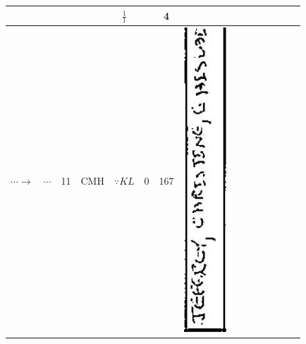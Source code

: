 \documentclass[10pt]{article}
\begin{document}
\begin{center}
\begin{tabular}{|c|c|c|c|c|c|c|c|c|c|c|c|c|c|c|}
 &  &  &  & \(\frac{1}{1}\) &  & 4 &  \\
\hline
\(\cdots \rightarrow\) & \(\cdots\) & 11 & CMH & \(\because K L\) & 0 & 167 & \includegraphics[max width=\textwidth]{2025_02_27_dd68c3d38de88f0516d9g-009(5)}

\end{tabular}
\end{center}
\end{document}
